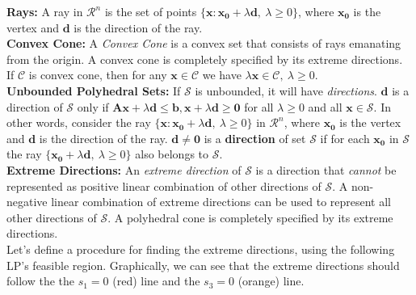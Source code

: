 {\bf Rays:} A ray in $\mathcal{R}^n$ is the set of points $\{\mathbf{x}: \mathbf{x_0} + \lambda\mathbf{d},~ \lambda \ge 0\}$, where $\mathbf{x_0}$ is the vertex and $\mathbf{d}$ is the direction of the ray.\\


{\bf Convex Cone:} A {\it Convex Cone} is a convex set that consists of rays emanating from the origin.  A convex cone is completely specified by its extreme directions.  If $\mathcal{C}$ is convex cone, then for any $\mathbf{x} \in \mathcal{C}$ we have $\lambda \mathbf{x} \in \mathcal{C},~ \lambda \ge 0$. \\

{\bf Unbounded Polyhedral Sets:} If $\mathcal{S}$ is unbounded, it will have {\it directions}. $\mathbf{d}$ is a direction of $\mathcal{S}$ only if $\mathbf{A} \mathbf{x} + \lambda\mathbf{d} \le \mathbf{b}, \mathbf{x} + \lambda\mathbf{d} \ge \mathbf{0}$ for all $\lambda \ge 0$ and all $\mathbf{x} \in \mathcal{S}$.  In other words, consider the ray $\{\mathbf{x}: \mathbf{x_0} + \lambda\mathbf{d},~ \lambda \ge 0\}$ in $\mathcal{R}^n$, where $\mathbf{x_0}$ is the vertex and $\mathbf{d}$ is the direction of the ray. $\mathbf{d} \ne \mathbf{0}$ is a {\bf direction} of set $\mathcal{S}$ if for each $\mathbf{x_0}$ in $\mathcal{S}$ the ray $\{\mathbf{x_0} + \lambda\mathbf{d},~ \lambda \ge 0\}$ also belongs to $\mathcal{S}$. \\

{\bf Extreme Directions:} An {\it extreme direction} of $\mathcal{S}$ is a direction that {\it cannot} be represented as positive linear combination of other directions of $\mathcal{S}$. A non-negative linear combination of extreme directions can be used to represent all other directions of $\mathcal{S}$. A polyhedral cone is completely specified by its extreme directions. \\

Let's define a procedure for finding the extreme directions, using the following LP's feasible region.  Graphically, we can see that the extreme directions should follow the the $s_1=0$ (red) line and the $s_3 = 0$ (orange) line. 
 
